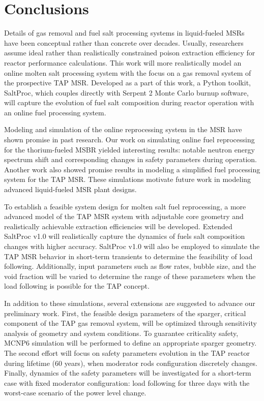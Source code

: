 \section{Conclusions}
Details of gas removal and fuel salt processing systems in liquid-fueled 
\glspl{MSR} have been conceptual rather than concrete over decades. Usually, 
researchers assume ideal rather than realistically constrained poison 
extraction efficiency for reactor performance calculations. 
This work will more realistically model an online molten salt processing 
system with the focus on a gas removal system of the prospective \gls{TAP} 
\gls{MSR}. Developed as a part of this work, a Python toolkit, SaltProc, which 
couples directly with Serpent 2 Monte Carlo burnup software, will capture the 
evolution of fuel salt composition during reactor operation with an online 
fuel processing system.

Modeling and simulation of the online reprocessing system in the \gls{MSR} 
have shown promise in past research. Our work on simulating online fuel  
reprocessing for the thorium-fueled \gls{MSBR} yielded interesting results: 
notable neutron energy spectrum shift and corresponding changes in safety 
parameters during operation. Another work also showed promise results in 
modeling a simplified fuel processing system for the \gls{TAP} \gls{MSR}. 
These simulations motivate future work in modeling advanced liquid-fueled 
\gls{MSR} plant designs.

To establish a feasible system design for molten salt fuel reprocessing, a 
more advanced model of the \gls{TAP} \gls{MSR} system with adjustable core 
geometry and realistically achievable extraction efficiencies will be 
developed. Extended SaltProc v1.0 will realistically capture the dynamics of 
fuels salt composition changes with higher accuracy. SaltProc v1.0 will also 
be employed to simulate the \gls{TAP} \gls{MSR} behavior in short-term 
transients to determine the feasibility of load following. Additionally, input 
parameters such as flow rates, bubble size, and the void fraction will be 
varied to determine the range of these parameters when the load following is 
possible for the \gls{TAP} concept.

In addition to these simulations, several extensions are suggested to 
advance our preliminary work. First, the feasible design parameters of the 
sparger, critical component of the \gls{TAP} gas removal system, will be 
optimized through sensitivity analysis of geometry and system conditions. To 
guarantee criticality safety, MCNP6 simulation will be performed to define an 
appropriate sparger geometry. The second effort will focus on safety  
parameters evolution in the \gls{TAP} reactor during lifetime (60 years),  
when moderator rods configuration discretely changes. Finally, dynamics of the 
safety parameters will be investigated for a short-term case with fixed 
moderator configuration: load following for three days with the worst-case 
scenario of the power level change. 

